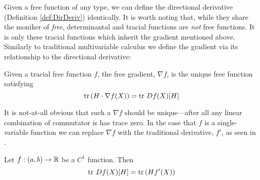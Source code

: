 Given a free function of any type, we can define the directional derivative
(Definition \ref{def:DirDeriv}) identically. It is worth noting that, while they
share the moniker of \emph{free}, determinantal and tracial functions are
\emph{not} free functions.
It is only these tracial functions which inherit the gradient mentioned above.
Similarly to traditional multivariable calculus we define the gradient via its
relationship to the directional derivative:
\begin{definition}
\label{def:FreeGrad}
  Given a tracial free function \(f\), the free gradient, \(\nabla f\), is the
  unique free function satisfying
  \[
    \operatorname{tr} \left( H \cdot \nabla f(X) \right) = \operatorname{tr}\, Df(X)[H]
  \]
\end{definition}

It is not-at-all obvious that such a \(\nabla f \) should be unique---after all
any linear combination of commutator is has trace zero.  In the case that \(f\)
is a single-variable function we can replace \(\nabla f\) with the traditional
derivative, \(f'\), as seen in
\cite[Thm 3.3]{pascoeTrace2020}.
\begin{theorem}
  Let \(f: (a,b)\to \mathbb{R} \) be a \(C^1\) function. Then
  \[
    \operatorname{tr} \, Df(X)[H] = \operatorname{tr} \left( Hf'(X) \right)
  \]
\end{theorem}

